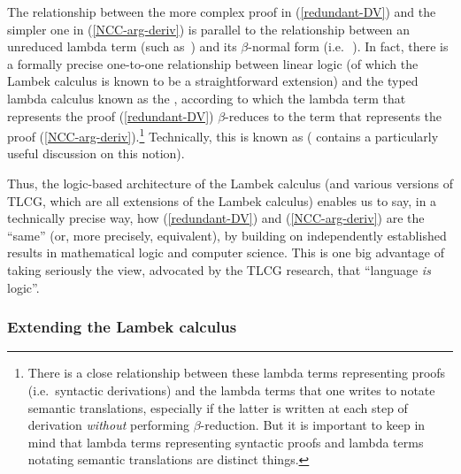 \documentclass[output=paper
                ,modfonts
 	        ,biblatex
                ,babelshorthands
                ,newtxmath
                ,draftmode
                ,colorlinks, citecolor=brown
]{langscibook}
\begin{document}
The relationship between the more complex proof in (\ref{redundant-DV}) and
the simpler one in (\ref{NCC-arg-deriv}) is parallel to the relationship
between an unreduced lambda term (such as
\,)
and its
$\beta$-normal form (i.e.\  \,).
In fact, there is a formally precise
one-to-one relationship between linear logic (of which the Lambek calculus is known
to be a straightforward extension) and the typed lambda calculus known
as the  \citep{howard1969}, according to which
the lambda term that represents the proof 
(\ref{redundant-DV}) $\beta$-reduces  to the term that represents the proof
(\ref{NCC-arg-deriv}).\footnote{There is a close relationship between these
lambda terms representing proofs (i.e.\ syntactic derivations) and the
lambda  terms that one writes 
to notate semantic translations, especially if the latter is written 
at each step of derivation \emph{without} performing $\beta$-reduction. But
it is important to keep in mind that
lambda terms representing syntactic proofs
and lambda terms notating semantic translations are distinct things.}
Technically, this is known as 
(\citealt[36--42, 137--144]{jaeger05} contains a particularly useful discussion on this notion). 

Thus, the logic-based architecture of the Lambek calculus (and various versions of
TLCG, which are all extensions of the Lambek calculus) enables us to say, in a
technically precise way, how (\ref{redundant-DV}) and (\ref{NCC-arg-deriv}) are
the ``same'' (or, more precisely, equivalent), by building on
independently established results in mathematical logic and computer
science. This is one big advantage of taking seriously the view,
advocated by the TLCG research, that ``language \emph{is} logic''.


\subsubsection{Extending the Lambek calculus \label{sec:extending}}
\end{document}
